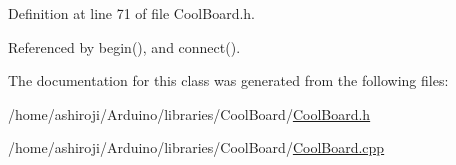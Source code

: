 Definition at line 71 of file Cool\+Board.\+h.



Referenced by begin(), and connect().



The documentation for this class was generated from the following files\+:\begin{DoxyCompactItemize}
\item 
/home/ashiroji/\+Arduino/libraries/\+Cool\+Board/\hyperlink{CoolBoard_8h}{Cool\+Board.\+h}\item 
/home/ashiroji/\+Arduino/libraries/\+Cool\+Board/\hyperlink{CoolBoard_8cpp}{Cool\+Board.\+cpp}\end{DoxyCompactItemize}
